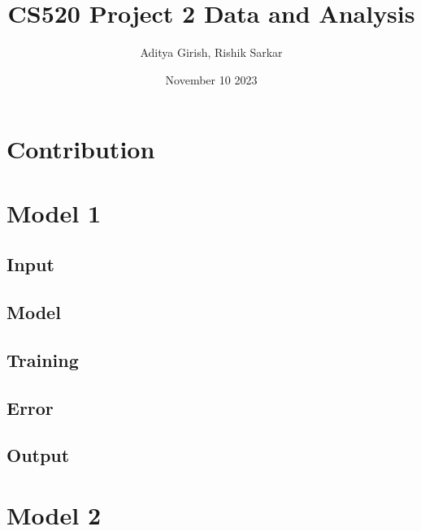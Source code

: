 \documentclass[11pt]{article}
\title{CS520 Project 2 Data and Analysis}
\author{Aditya Girish, Rishik Sarkar}
\date{November 10 2023}
\begin{document}
\maketitle
\section{Contribution}

\section{Model 1}

\subsection{Input}

\subsection{Model}

\subsection{Training}

\subsection{Error}

\subsection{Output}

\section{Model 2}



\end{document}

